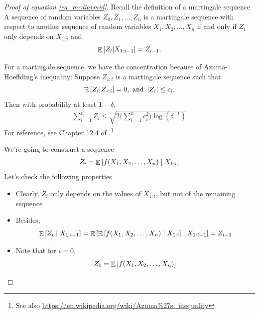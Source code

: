 \begin{proof}[Proof of equation \eqref{eq_mcdiarmid}]
Recall the definition of a martingale sequence
A sequence of random variables $Z_0, Z_1, \dots, Z_n$ is a martingale sequence with respect to another sequence of random variables $X_1, X_2, \dots, X_n$ if and only if $Z_i$ only depends on $X_{1:i}$ and \[ \mathop{\mathbb{E}}\left[ Z_i | X_{1:i-1} \right] = Z_{i-1}. \]

For a martingale sequence, we have the concentration because of Azuma-Hoeffding’s inequality: Suppose $Z_{1:t}$ is a martingale sequence such that \[ \mathop{\mathbb{E}}\left[ Z_i | Z_{< i} \right] = 0, \text{ and } \left\lvert Z_i\right\rvert \le c_i. \] Then with probability at least $1 - \delta$,
    \begin{align}\label{eq_azuma}
        \sum_{i = 1}^n Z_i \le \sqrt{2\Big(\sum_{i=1}^n c_i^2\Big) \log(\delta^{-1})}
    \end{align}
    For reference, see Chapter 12.4 of \citet{mitzenmacher2017probability}.\footnote{See also \url{https://en.wikipedia.org/wiki/Azuma\%27s_inequality}}

We’re going to construct a sequence
\begin{align}
    Z_i = \mathop{\mathbb{E}}\left[ f(X_1, X_2, \dots, X_n) \mid X_{1:i} \right]
\end{align}
Let’s check the following properties
\begin{itemize}
    \item Clearly, $Z_i$ only depends on the values of $X_{1:i}$, but not of the remaining sequence

    \item Besides,
    \[ \mathop{\mathbb{E}}\left[ Z_i \mid X_{1:i-1} \right] = \mathop{\mathbb{E}}\left[ \mathop{\mathbb{E}}\left[ f(X_1, X_2, \dots, X_n) \mid X_{1:i} \right] \mid X_{1:i-1} \right] = Z_{i-1} \]

    \item Note that for $i = 0$, \[ Z_0 = \mathop{\mathbb{E}}\left[ f(X_1, X_2, \dots, X_n) \right] \]


\end{itemize}
\end{proof}
